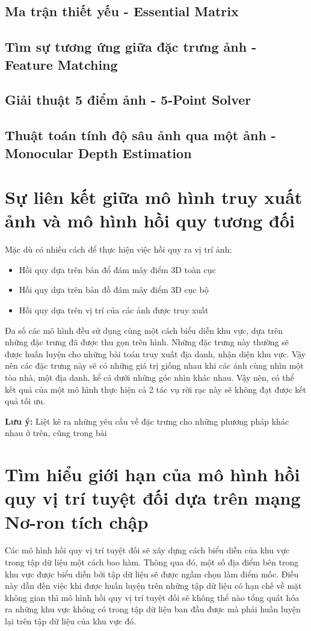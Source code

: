 \subsection{Ma trận thiết yếu - Essential Matrix}
\subsection{Tìm sự tương ứng giữa đặc trưng ảnh - Feature Matching}
\subsection{Giải thuật 5 điểm ảnh - 5-Point Solver}
\subsection{Thuật toán tính độ sâu ảnh qua một ảnh - Monocular Depth Estimation}
\section{Sự liên kết giữa mô hình truy xuất ảnh và mô hình hồi quy tương đối}
Mặc dù có nhiều cách để thực hiện việc hồi quy ra vị trí ảnh:
\begin{itemize}
    \item Hồi quy dựa trên bản đổ đám mây điểm 3D toàn cục
    \item Hồi quy dựa trên bản đồ đám mây điểm 3D cục bộ
    \item Hồi quy dựa trên vị trí của các ảnh được truy xuất
\end{itemize}
Đa số các mô hình đều sử dụng cùng một cách biểu diễn khu vực, dựa trên những đặc trưng đã được thu gọn trên hình. Những đặc trưng này thường sẽ được huấn luyện cho những bài toán truy xuất địa danh, nhận diện khu vực. Vậy nên các đặc trưng này sẽ có những giá trị giống nhau khi các ảnh cùng nhìn một tòa nhà, một địa danh, kể cả dưới những góc nhìn khác nhau. Vậy nên, có thể kết quả của một mô hình thực hiện cả 2 tác vụ rời rạc này sẽ không đạt được kết quả tối ưu.\cite{pion2020benchmarking}

\textbf{Lưu ý:} Liệt kê ra những yêu cầu về đặc trưng cho những phương pháp khác nhau ở trên, cũng trong bài \cite{pion2020benchmarking}
\section{Tìm hiểu giới hạn của mô hình hồi quy vị trí tuyệt đối dựa trên mạng Nơ-ron tích chập}
Các mô hình hồi quy vị trí tuyệt đối sẽ xây dựng cách biểu diễn của khu vực trong tập dữ liệu một cách bao hàm. Thông qua đó, một số địa điểm bên trong khu vực được biểu diễn bởi tập dữ liệu sẽ được ngầm chọn làm điểm mốc. Điều này dẫn đến việc khi được huấn luyện trên những tập dữ liệu có hạn chế về mặt không gian thì mô hình hồi quy vị trí tuyệt đối sẽ không thể nào tổng quát hóa ra những khu vực không có trong tập dữ liệu ban đầu được mà phải huấn luyện lại trên tập dữ liệu của khu vực đó.\cite{sattler2019understanding}

